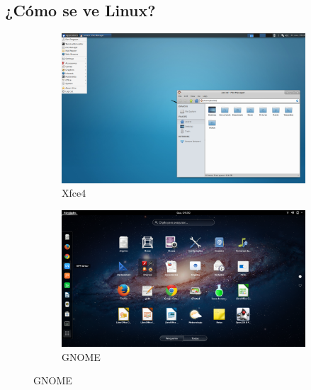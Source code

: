 \documentclass[aspectratio=43]{beamer}
\begin{document}
    \subsection{¿Cómo se ve Linux?}
    \begin{frame}{\secname}{\subsecname}
        \begin{figure}
            \centering
            \begin{subfigure}{.4\textwidth}
                \centering
                \includegraphics[width=\textwidth]{img/xfce4.png}
                \caption*{Xfce4}
            \end{subfigure}
            \begin{subfigure}{.4\textwidth}
                \centering
                \includegraphics[width=\textwidth]{img/gnome.png}
                \caption*{GNOME}
            \end{subfigure}
        \end{figure}
        \begin{figure}
            \centering
            \begin{subfigure}{.4\textwidth}

\end{subfigure}
\end{figure}
\end{frame}
\end{document}
